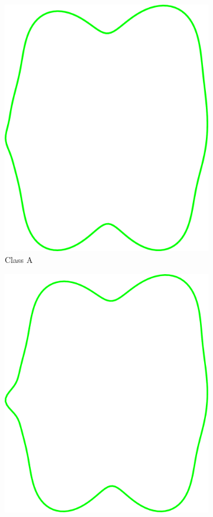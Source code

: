 \documentclass[pdftex,12pt,a4paper]{report}
\begin{document}
\begin{figure}[h]
	\centering
	\begin{subfigure}[b]{0.24\textwidth}
		\centering
		\includegraphics[width=.9\linewidth]{img/synthetic-generation/classes/1-1.pdf}
		\caption{Class A}
		\label{subfig:synthetic-classes:a-1}
	\end{subfigure}
	\begin{subfigure}[b]{0.24\textwidth}
		\centering
		\includegraphics[width=.9\linewidth]{img/synthetic-generation/classes/1-2.pdf}

\end{subfigure}
\end{figure}
\end{document}
